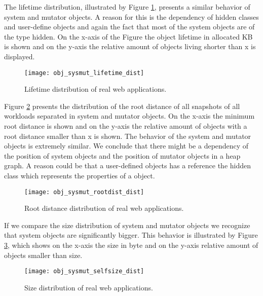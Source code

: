 The lifetime distribution, illustrated by Figure \ref{fig:obj_sysmut_lieftiem_dist}, presents a similar behavior of system and mutator objects. A reason for this is the dependency of hidden classes and user-define objects and again the fact that most of the system objects are of the type hidden. On the x-axis of the Figure the object lifetime in allocated KB is shown and on the y-axis the relative amount of objects living shorter than x is displayed. 
\begin{figure}
	\centering
	\texttt{[image: obj\_sysmut\_lifetime\_dist]}
	\caption{Lifetime distribution of real web applications.}
	\label{fig:obj_sysmut_lieftiem_dist}
\end{figure}

Figure \ref{fig:obj_sysmut_rootdist_dist} presents the distribution of the root distance of all snapshots of all workloads separated in system and mutator objects. On the x-axis the minimum root distance is shown and on the y-axis the relative amount of objects with a root distance smaller than x is shown. The behavior of the system and mutator objects is extremely similar. We conclude that there might be a dependency of the position of system objects and the position of mutator objects in a heap graph. A reason could be that a user-defined objects has a reference the hidden class which represents the properties of a object.  
\begin{figure}
	\centering
	\texttt{[image: obj\_sysmut\_rootdist\_dist]}
	\caption{Root distance distribution of real web applications.}
	\label{fig:obj_sysmut_rootdist_dist}
\end{figure}

If we compare the size distribution of system and mutator objects we recognize that system objects are significantly bigger. This behavior is illustrated by Figure \ref{fig:obj_sysmut_selfsize_dist}, which shows on the x-axis the size in byte and on the y-axis relative amount of objects smaller than size.
\begin{figure}
	\centering
	\texttt{[image: obj\_sysmut\_selfsize\_dist]}
	\caption{Size distribution of real web applications.}
	\label{fig:obj_sysmut_selfsize_dist}
\end{figure}